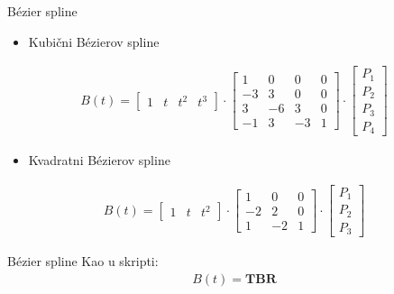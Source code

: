 \documentclass[9pt]{beamer}
\begin{document}
\begin{frame}{B\'{e}zier spline}
	\begin{itemize}
		\item Kubični B\'{e}zierov spline
	\end{itemize}
	\begin{align*}
	B(t) = \begin{bmatrix}
	1 & t & t^2 & t^3
	\end{bmatrix}
	\cdot
	\begin{bmatrix}
	1 &  0 &  0 & 0 \\
	-3 &  3 &  0 & 0 \\
	3 & -6 &  3 & 0 \\
	-1 &  3 & -3 & 1
	\end{bmatrix}
	\cdot
	\begin{bmatrix}
	P_1 \\ P_2 \\ P_3 \\ P_4
	\end{bmatrix}
	\end{align*}
	
	\begin{itemize}
		\item Kvadratni B\'{e}zierov spline
	\end{itemize}
	\begin{align*}
	B(t) = \begin{bmatrix}
	1 & t & t^2
	\end{bmatrix}
	\cdot
	\begin{bmatrix}
	1 &  0 & 0 \\
	-2 &  2 & 0 \\
	1 & -2 & 1
	\end{bmatrix}
	\cdot
	\begin{bmatrix}
	P_1 \\ P_2 \\ P_3
	\end{bmatrix}
	\end{align*}
\end{frame}

\begin{frame}{B\'{e}zier spline}
	Kao u skripti:
	\begin{align*}
	B(t) = \mathbf{T}\mathbf{B}\mathbf{R}
	\end{align*}
\end{frame}
\end{document}

